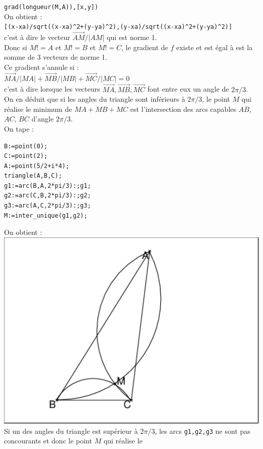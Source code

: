 \documentclass[a4paper,11pt]{book}
\begin{document}
 {\tt grad(longueur(M,A)),[x,y])}\\
On obtient :\\
{\tt [(x-xa)/sqrt((x-xa)\verb|^|2+(y-ya)\verb|^|2),(y-xa)/sqrt((x-xa)\verb|^|2+(y-ya)\verb|^|2)]}\\
c'est \`a dire le vecteur $\overrightarrow{AM}/|AM|$ qui est norme 1.\\
Donc si $M!=A$ et $M!=B$ et $M!=C$, le gradient de $f$ existe et est \'egal 
\`a est la somme de 3 vecteurs de norme 1.\\
Ce gradient s'annule si :\\
$\overrightarrow{MA}/|MA|+\overrightarrow{MB}/|MB|+\overrightarrow{MC}/|MC|=0$\\
c'est \`a dire lorsque les vecteurs 
$\overrightarrow{MA},\overrightarrow{MB},\overrightarrow{MC}$
font entre eux un angle de $2\pi/3$.\\
On en d\'eduit que si les angles du triangle sont inf\'erieurs \`a $2\pi/3$, 
le point $M$ qui r\'ealise le minimum de $MA+MB+MC$ est l'intersection des arcs
capables $AB$, $AC$, $BC$ d'angle $2\pi/3$.\\
On tape :
\begin{verbatim}
B:=point(0);
C:=point(2);
A:=point(5/2+i*4);
triangle(A,B,C);
g1:=arc(B,A,2*pi/3):;g1;
g2:=arc(C,B,2*pi/3):;g2;
g3:=arc(A,C,2*pi/3):;g3;
M:=inter_unique(g1,g2);
\end{verbatim}
On obtient :\\
\includegraphics[width=\textwidth]{mabc2}\\
Si un des angles du triangle est sup\'erieur \`a $2\pi/3$, les arcs 
{\tt g1,g2,g3} ne sont pas concourants et donc le point $M$ qui r\'ealise le 
\end{document}
